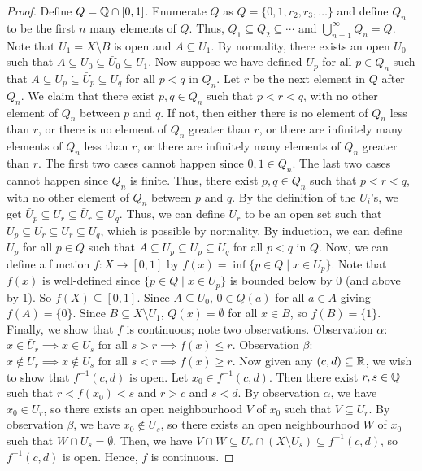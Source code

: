 \begin{proof}
    Define $Q = \mathbb{Q} \cap [0,1]$. Enumerate $Q$ as $Q = \{0,1,r_{2},r_{3},\ldots\}$ and define $Q_{n}$ to be the first $n$ many elements of $Q$. Thus, $Q_{1} \subseteq Q_{2} \subseteq \cdots$ and $\bigcup_{n=1}^{\infty} Q_{n} = Q$. Note that $U_{1} = X \setminus B$ is open and $A \subseteq U_{1}$. By normality, there exists an open $U_{0}$ such that $A \subseteq U_{0} \subseteq \bar{U}_{0} \subseteq U_{1}$. Now suppose we have defined $U_{p}$ for all $p \in Q_{n}$ such that $A \subseteq U_{p} \subseteq \bar{U}_{p} \subseteq U_{q}$ for all $p < q$ in $Q_{n}$. Let $r$ be the next element in $Q$ after $Q_{n}$. We claim that there exist $p,q \in Q_{n}$ such that $p < r < q$, with no other element of $Q_{n}$ between $p$ and $q$. If not, then either there is no element of $Q_{n}$ less than $r$, or there is no element of $Q_{n}$ greater than $r$, or there are infinitely many elements of $Q_{n}$ less than $r$, or there are infinitely many elements of $Q_{n}$ greater than $r$. The first two cases cannot happen since $0,1 \in Q_{n}$. The last two cases cannot happen since $Q_{n}$ is finite. Thus, there exist $p,q \in Q_{n}$ such that $p < r < q$, with no other element of $Q_{n}$ between $p$ and $q$. By the definition of the $U_{i}$'s, we get $\bar{U}_{p} \subseteq U_{r} \subseteq \bar{U}_{r} \subseteq U_{q}$. Thus, we can define $U_{r}$ to be an open set such that $\bar{U}_{p} \subseteq U_{r} \subseteq \bar{U}_{r} \subseteq U_{q}$, which is possible by normality. By induction, we can define $U_{p}$ for all $p \in Q$ such that $A \subseteq U_{p} \subseteq \bar{U}_{p} \subseteq U_{q}$ for all $p < q$ in $Q$. Now, we can define a function $f:X \to [0,1]$ by $f(x) = \inf\{p \in Q \mid x \in U_{p}\}$. Note that $f(x)$ is well-defined since $\{p \in Q \mid x \in U_{p}\}$ is bounded below by $0$ (and above by $1$). So $f(X) \subseteq [0,1]$. Since $A \subseteq U_{0}$, $0 \in Q(a)$ for all $a \in A$ giving $f(A) = \{0\}$. Since $B \subseteq X \setminus U_{1}$, $Q(x) = \emptyset$ for all $x \in B$, so $f(B) = \{1\}$. Finally, we show that $f$ is continuous; note two observations. Observation $\alpha$: $x \in \bar{U}_{r} \implies x \in U_{s} \text{ for all } s > r \implies f(x) \leq r$. Observation $\beta$: $x \notin U_{r} \implies x \notin U_{s} \text{ for all } s < r \implies f(x) \geq r$. Now given any $(c,d) \subseteq \mathbb{R}$, we wish to show that $f^{-1}(c,d)$ is open. Let $x_{0} \in f^{-1}(c,d)$. Then there exist $r,s \in \mathbb{Q}$ such that $r < f(x_{0}) < s$ and $r > c$ and $s < d$. By observation $\alpha$, we have $x_{0} \in \bar{U}_{r}$, so there exists an open neighbourhood $V$ of $x_{0}$ such that $V \subseteq U_{r}$. By observation $\beta$, we have $x_{0} \notin U_{s}$, so there exists an open neighbourhood $W$ of $x_{0}$ such that $W \cap U_{s} = \emptyset$. Then, we have $V \cap W \subseteq U_{r} \cap (X \setminus U_{s}) \subseteq f^{-1}(c,d)$, so $f^{-1}(c,d)$ is open. Hence, $f$ is continuous.
\end{proof}

